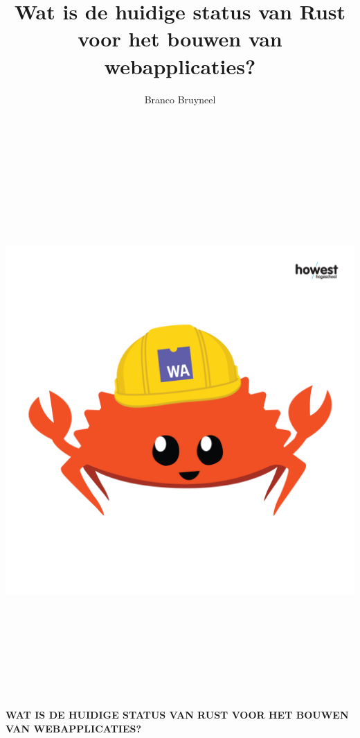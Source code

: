 \documentclass[11pt,a4paper,oneside]{book}
\author{Branco Bruyneel}
\title{Wat is de huidige status van Rust voor het bouwen van webapplicaties?}
\begin{document}
\begin{titlepage}
    \begin{center}
      \includegraphics[width=21cm, height=21cm]{rust_wasm.png}
    \end{center}
    \begin{adjustwidth}{1.5cm}{1.5cm}

    \vspace{0.5em}

    \MakeUppercase{\huge\textbf{Wat is de huidige status van Rust voor het bouwen van
      webapplicaties?}}

    \vspace{1em}


\end{adjustwidth}
\end{titlepage}
\end{document}
